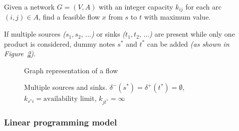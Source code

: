 \documentclass[english]{article}
\begin{document}
\begin{definition}
  Given a network \(G = \left( V, A \right)\) with an integer capacity \(k_{ij}\) for each arc \((i, j) \in A\), find a feasible flow \(x\) from \(s\) to \(t\) with maximum value.

  If multiple sources \textit{(\(s_1, s_2, \, \ldots \))} or sinks \textit{(\(t_1, t_2, \, \ldots \))} are present while only one product is considered, dummy notes \(s^\ast\) and \(t^\ast\) can be added \textit{(as shown in Figure~\ref{fig:multiple-sources-sinks})}.
  \label{def:flow-problem}
\end{definition}

\begin{figure}[htbp]
  \centering
  \bigskip
  \caption{Graph representation of a flow}
  \label{fig:flow-graph-representation}
  \bigskip
\end{figure}
\begin{figure}[htbp]
  \centering
  \bigskip
  \caption{Multiple sources and sinks. \(\delta^-(s^\ast) = \delta^+(t^\ast) = \emptyset\), \(k_{s^\ast i} = \text{availability limit}\), \(k_{jt^\ast} = \infty\)}
  \label{fig:multiple-sources-sinks}
  \bigskip
\end{figure}


\subsubsection{Linear programming model}
\end{document}
